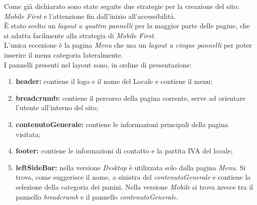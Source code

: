 Come già dichiarato sono state seguite due strategie per la creazione del sito: \emph{Mobile First} e l'attenzione fin dall'inizio all'accessibilità.\\
È stato scelto un \emph{layout a quattro pannelli} per la maggior parte delle pagine, che si adatta facilmente alla strategia di \emph{Mobile First}.\\
L'unica eccezione è la pagina \emph{Menu} che usa un \emph{layout a cinque pannelli} per poter inserire il menu categoria lateralmente.\\
I pannelli presenti nel layout sono, in ordine di presentazione:
\begin{enumerate}
	\item \textbf{header:} contiene il logo e il nome del Locale e contiene il menu; 
	\item \textbf{breadcrumb:} contiene il percorso della pagina corrente, serve ad orientare l'utente all'interno del sito;
	\item \textbf{contenutoGenerale:} contiene le informazioni principali della pagina visitata;
	\item \textbf{footer:} contiene le informazioni di contatto e la partita IVA del locale;
	\item \textbf{leftSideBar:} nella versione \emph{Desktop} è utilizzata solo dalla pagina \emph{Menu}.
	 Si trova, come suggerisce il nome, a sinistra del \emph{contenutoGenerale} e contiene la selezione della categoria dei panini. 
	Nella versione \emph{Mobile} si trova invece tra il pannello \emph{breadcrumb} e il pannello \emph{contenutoGenerale}.
\end{enumerate}